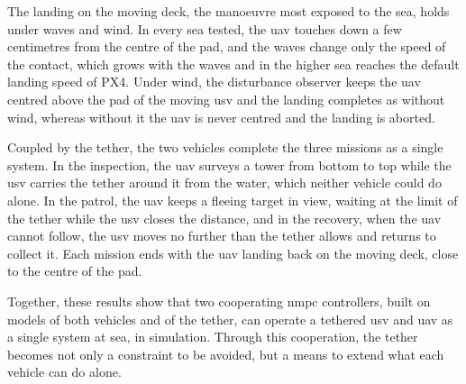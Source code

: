 The landing on the moving deck, the manoeuvre most exposed to the sea, holds under waves and wind. In every sea tested, the \gls{uav} touches down a few centimetres from the centre of the pad, and the waves change only the speed of the contact, which grows with the waves and in the higher sea reaches the default landing speed of PX4. Under wind, the disturbance observer keeps the \gls{uav} centred above the pad of the moving \gls{usv} and the landing completes as without wind, whereas without it the \gls{uav} is never centred and the landing is aborted.

Coupled by the tether, the two vehicles complete the three missions as a single system. In the inspection, the \gls{uav} surveys a tower from bottom to top while the \gls{usv} carries the tether around it from the water, which neither vehicle could do alone. In the patrol, the \gls{uav} keeps a fleeing target in view, waiting at the limit of the tether while the \gls{usv} closes the distance, and in the recovery, when the \gls{uav} cannot follow, the \gls{usv} moves no further than the tether allows and returns to collect it. Each mission ends with the \gls{uav} landing back on the moving deck, close to the centre of the pad.

Together, these results show that two cooperating \gls{nmpc} controllers, built on models of both vehicles and of the tether, can operate a tethered \gls{usv} and \gls{uav} as a single system at sea, in simulation. Through this cooperation, the tether becomes not only a constraint to be avoided, but a means to extend what each vehicle can do alone.
